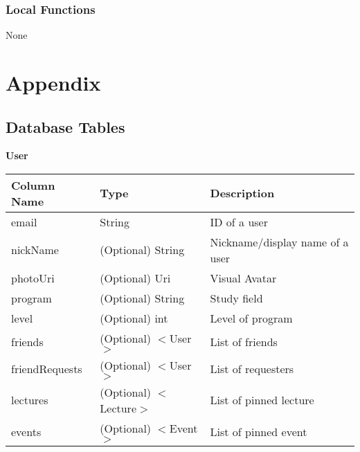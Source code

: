 \documentclass[12pt, titlepage]{article}
\begin{document}
\subsubsection{Local Functions}

None

\newpage

\section{Appendix} \label{Appendix}
\subsection{Database Tables}

\quad \textbf{User}
\begin{table}[H]
	\begin{tabular}{|p{}|p{}|p{}|}
		\hline
		\textbf{Column Name} & \textbf{Type}  & \textbf{Description}                  \\
		\hline
		email                   & String                & ID of a user                        \\
		\hline
		nickName           & (Optional) String                & Nickname/display name of a user      \\
		\hline
		photoUri           & (Optional) Uri                & Visual Avatar       \\
		\hline
		program            & (Optional) String                & Study field                \\
		\hline
		level             & (Optional) int                & Level of program                 \\
		\hline
		friends          &  (Optional) $<$User$>$                & List of friends \\
		\hline
		friendRequests          &  (Optional) $<$User$>$                & List of requesters              \\
		\hline
		lectures                & (Optional) $<$Lecture$>$                & List of pinned lecture                     \\
		\hline
		events                & (Optional) $<$Event$>$                & List of pinned event                     \\			
		\hline
\end{tabular}
\end{table}
\end{document}
